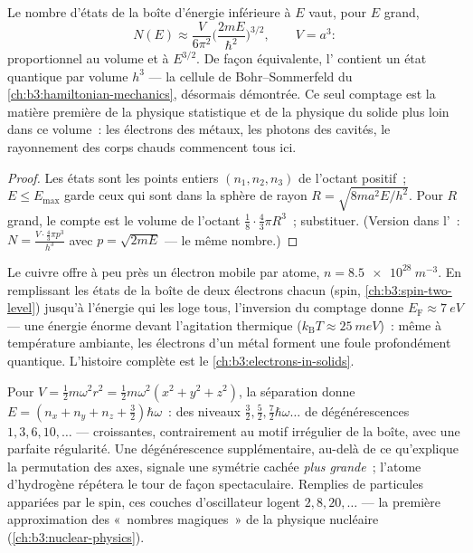 \begin{proposition}\label{prop:b3:schrodinger-three-dimensions:counting}
Le nombre d'états de la boîte d'énergie inférieure à $E$ vaut, pour $E$ grand,
\[
N(E) \approx \frac{V}{6\pi^2}\Big(\frac{2mE}{\hbar^2}\Big)^{3/2} ,
\qquad V = a^3 :
\]
proportionnel au volume et à $E^{3/2}$. De façon équivalente, l' contient un état quantique par volume $h^3$ --- la cellule
de Bohr--Sommerfeld du
\cref{ch:b3:hamiltonian-mechanics}, désormais démontrée. Ce seul
comptage est la matière première de la physique statistique et de la
physique du solide plus loin dans ce volume~: les électrons des métaux,
les photons des cavités, le rayonnement des corps chauds commencent
tous ici.
\end{proposition}

\begin{proof}
Les états sont les points entiers $(n_1, n_2, n_3)$ de l'octant
positif~; $E \le E_{\max}$ garde ceux qui sont dans la sphère de rayon $R =
\sqrt{8ma^2E/h^2}$. Pour $R$ grand, le compte est le volume de l'octant
$\tfrac18\cdot\tfrac43\pi R^3$~; substituer. (Version dans l'~: $N = \tfrac{V\cdot\frac43\pi p^3}{h^3}$ avec $p = \sqrt{2mE}$
--- le même nombre.)
\end{proof}

\begin{example}\label{ex:b3:schrodinger-three-dimensions:metal}
Le cuivre offre à peu près un électron mobile par atome, $n =
\qty{8.5e28}{m^{-3}}$. En remplissant les états de la boîte de deux
électrons chacun (spin, \cref{ch:b3:spin-two-level}) jusqu'à l'énergie
qui les loge tous, l'inversion du comptage donne $E_{\text{F}}
\approx \qty{7}{eV}$ --- une énergie énorme devant l'agitation
thermique ($k_{\text{B}}T \approx \qty{25}{meV}$)~: même à température
ambiante, les électrons d'un métal forment une foule profondément
quantique. L'histoire complète est le
\cref{ch:b3:electrons-in-solids}.
\end{example}

\begin{example}\label{ex:b3:schrodinger-three-dimensions:oscillator}
Pour $V = \tfrac12 m\omega^2r^2 = \tfrac12 m\omega^2(x^2 + y^2 +
z^2)$, la séparation donne $E = (n_x + n_y + n_z + \tfrac32)\hbar\omega$~:
des niveaux $\tfrac32, \tfrac52, \tfrac72\hbar\omega\ldots$ de
dégénérescences $1, 3, 6, 10, \dots$ --- croissantes, contrairement au
motif irrégulier de la boîte, avec une parfaite régularité. Une
dégénérescence supplémentaire, au-delà de ce qu'explique la permutation
des axes, signale une symétrie cachée \emph{plus grande}~; l'atome
d'hydrogène répétera le tour de façon spectaculaire. Remplies de
particules appariées par le spin, ces couches d'oscillateur logent $2,
8, 20, \dots$ --- la première approximation des «~nombres magiques~» de
la physique nucléaire (\cref{ch:b3:nuclear-physics}).
\end{example}

